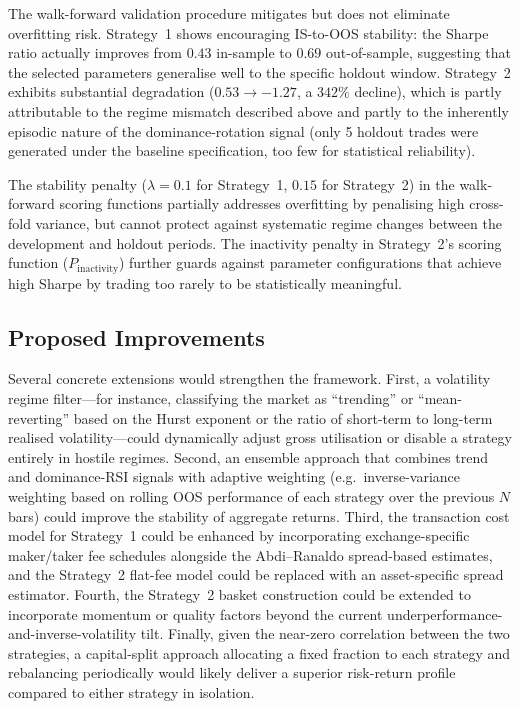 \documentclass[11pt,a4paper]{article}
\begin{document}
The walk-forward validation procedure mitigates but does not eliminate overfitting risk.  Strategy~1 shows encouraging IS-to-OOS stability: the Sharpe ratio actually improves from $0.43$ in-sample to $0.69$ out-of-sample, suggesting that the selected parameters generalise well to the specific holdout window.  Strategy~2 exhibits substantial degradation ($0.53 \to -1.27$, a $342\%$ decline), which is partly attributable to the regime mismatch described above and partly to the inherently episodic nature of the dominance-rotation signal (only 5 holdout trades were generated under the baseline specification, too few for statistical reliability).

The stability penalty ($\lambda = 0.1$ for Strategy~1, $0.15$ for Strategy~2) in the walk-forward scoring functions partially addresses overfitting by penalising high cross-fold variance, but cannot protect against systematic regime changes between the development and holdout periods.  The inactivity penalty in Strategy~2's scoring function ($P_{\text{inactivity}}$) further guards against parameter configurations that achieve high Sharpe by trading too rarely to be statistically meaningful.

\subsection{Proposed Improvements}

Several concrete extensions would strengthen the framework.  First, a volatility regime filter---for instance, classifying the market as ``trending'' or ``mean-reverting'' based on the Hurst exponent or the ratio of short-term to long-term realised volatility---could dynamically adjust gross utilisation or disable a strategy entirely in hostile regimes.  Second, an ensemble approach that combines trend and dominance-RSI signals with adaptive weighting (e.g.\ inverse-variance weighting based on rolling OOS performance of each strategy over the previous $N$ bars) could improve the stability of aggregate returns.  Third, the transaction cost model for Strategy~1 could be enhanced by incorporating exchange-specific maker/taker fee schedules alongside the Abdi--Ranaldo spread-based estimates, and the Strategy~2 flat-fee model could be replaced with an asset-specific spread estimator.  Fourth, the Strategy~2 basket construction could be extended to incorporate momentum or quality factors beyond the current underperformance-and-inverse-volatility tilt.  Finally, given the near-zero correlation between the two strategies, a capital-split approach allocating a fixed fraction to each strategy and rebalancing periodically would likely deliver a superior risk-return profile compared to either strategy in isolation.
\end{document}
